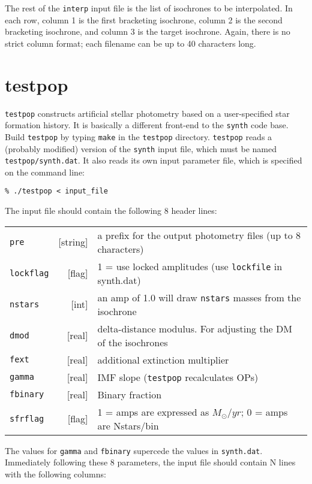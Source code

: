 \documentclass[12pt]{book}
\def\ttg{\tt\color{DarkGreen}}
\def\tto{\tt\color{myOrange}}
\begin{document}
The rest of the {\ttg interp} input file is the list of isochrones to 
be interpolated.  In each row, column 1 is the first bracketing 
isochrone, column 2 is the second bracketing isochrone, and column 3 
is the target isochrone.  Again, there is no strict column format; 
each filename can be up to 40 characters long.


\chapter{testpop}\label{ch:testpop}

{\ttg testpop} constructs artificial stellar photometry based on a 
user-specified star formation history.  It is basically a different 
front-end to the {\ttg synth} code base.  Build {\ttg testpop} by 
typing {\ttg make} in the {\ttg testpop} directory.  {\ttg testpop} 
reads a (probably modified) version of the {\ttg synth} input file, 
which must be named {\ttg testpop/synth.dat}.  It also reads its 
own input parameter file, which is specified on the command line:

\medskip
\noindent 
{\ttg \% ./testpop < input\_file}

\medskip
\noindent 
The input file should contain the following 8 header lines:

\medskip
\noindent
\begin{tabular}{|lr|l|} \hline
{\tto pre}      &[string]& a prefix for the output photometry files (up to 8 characters) \\
{\tto lockflag} &[flag]& 1 = use locked amplitudes (use {\tto lockfile} in synth.dat) \\
{\tto nstars}   &[int]& an amp of 1.0 will draw {\tto nstars} masses from the isochrone \\
{\tto dmod}     &[real]& delta-distance modulus.  For adjusting the DM of the isochrones \\
{\tto fext}     &[real]& additional extinction multiplier \\
{\tto gamma}    &[real]& IMF slope ({\ttg testpop} recalculates OPs) \\
{\tto fbinary}  &[real]& Binary fraction \\ 
{\tto sfrflag}  &[flag]& 1 = amps are expressed as $M_\odot/yr$; 0 = amps are Nstars/bin \\ \hline
\end{tabular}

\medskip
\noindent
The values for {\tto gamma} and {\tto fbinary} supercede the values in 
{\ttg synth.dat}.  Immediately following these 8 parameters, the input 
file should contain N lines with the following columns:
\end{document}
